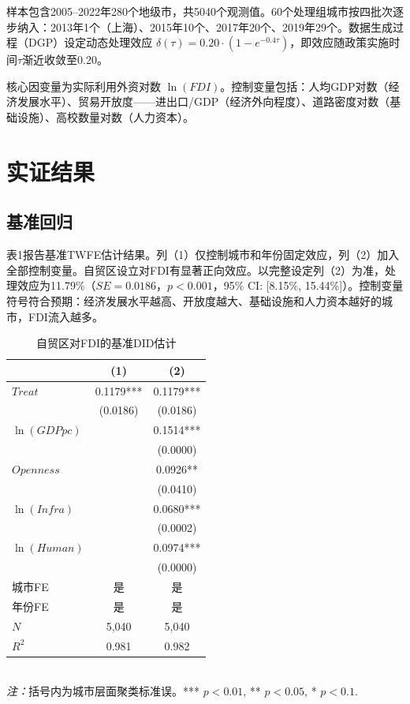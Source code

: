 \documentclass[12pt,a4paper]{article}
\begin{document}
样本包含2005--2022年280个地级市，共5040个观测值。60个处理组城市按四批次逐步纳入：2013年1个（上海）、2015年10个、2017年20个、2019年29个。数据生成过程（DGP）设定动态处理效应 $\delta(\tau)=0.20\cdot(1-e^{-0.4\tau})$，即效应随政策实施时间$\tau$渐近收敛至0.20。

核心因变量为实际利用外资对数 $\ln(FDI)$。控制变量包括：人均GDP对数（经济发展水平）、贸易开放度——进出口/GDP（经济外向程度）、道路密度对数（基础设施）、高校数量对数（人力资本）。

\section{实证结果}

\subsection{基准回归}

表1报告基准TWFE估计结果。列（1）仅控制城市和年份固定效应，列（2）加入全部控制变量。自贸区设立对FDI有显著正向效应。以完整设定列（2）为准，处理效应为11.79\%（$SE=0.0186$，$p<0.001$，95\% CI: [8.15\%, 15.44\%]）。控制变量符号符合预期：经济发展水平越高、开放度越大、基础设施和人力资本越好的城市，FDI流入越多。

\begin{table}[H]
\centering
\caption{自贸区对FDI的基准DID估计}
\label{tab:baseline}
\begin{tabular}{lcc}
\toprule
 & (1) & (2) \\
\midrule
$Treat$ & 0.1179*** & 0.1179*** \\
 & (0.0186) & (0.0186) \\
$\ln(GDPpc)$ & & 0.1514*** \\
 & & (0.0000) \\
$Openness$ & & 0.0926** \\
 & & (0.0410) \\
$\ln(Infra)$ & & 0.0680*** \\
 & & (0.0002) \\
$\ln(Human)$ & & 0.0974*** \\
 & & (0.0000) \\
\midrule
城市FE & 是 & 是 \\
年份FE & 是 & 是 \\
$N$ & 5,040 & 5,040 \\
$R^2$ & 0.981 & 0.982 \\
\bottomrule
\end{tabular}
\\
\footnotesize \textit{注：}括号内为城市层面聚类标准误。*** $p<0.01$, ** $p<0.05$, * $p<0.1$.
\end{table}
\end{document}

